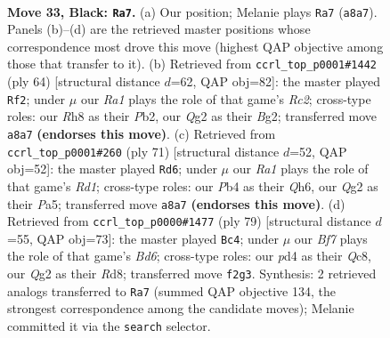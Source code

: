 \documentclass[11pt]{article}
\begin{document}
\clearpage

\begin{figure}[p]\centering
\begin{subfigure}{0.46\textwidth}\centering
\resizebox{\linewidth}{!}{%
\newchessgame
\chessboard[
  setfen={r6r/4k2p/1pp1p1p1/6P1/1p1P4/PP1KP3/R4bq1/2BQ4 b - - 0 33},
  showmover=false,
  pgfstyle=straightmove, color=movearrow, markmove={a8-a7}
]}
\caption{}
\end{subfigure}\hfill
\begin{subfigure}{0.46\textwidth}\centering
\resizebox{\linewidth}{!}{%
\newchessgame
\chessboard[
  setfen={3r2k1/p1q2bp1/1p6/2pp4/P2P3P/3Q2P1/1PR3BK/8 w - - 10 33},
  showmover=false,
  pgfstyle=straightmove, color=movearrow, markmove={c2-f2}
]}
\caption{}
\end{subfigure}
\\[4pt]
\begin{subfigure}{0.46\textwidth}\centering
\resizebox{\linewidth}{!}{%
\newchessgame
\chessboard[
  setfen={r2r4/6pk/7q/p3p3/1p2P3/1PP3P1/1B1PQ3/1K1R4 b - - 1 36},
  showmover=false,
  pgfstyle=straightmove, color=movearrow, markmove={d8-d6}
]}
\caption{}
\end{subfigure}\hfill
\begin{subfigure}{0.46\textwidth}\centering
\resizebox{\linewidth}{!}{%
\newchessgame
\chessboard[
  setfen={2qr2k1/5rpp/5P2/2p1B1P1/p3P3/P2b3P/5RBK/4Q3 b - - 0 40},
  showmover=false,
  pgfstyle=straightmove, color=movearrow, markmove={d3-c4}
]}
\caption{}
\end{subfigure}
\caption{\textbf{Move 33, Black: \texttt{Ra7}.} (a) Our position; Melanie plays \texttt{Ra7} (\texttt{a8a7}). Panels (b)--(d) are the retrieved master positions whose correspondence most drove this move (highest QAP objective among those that transfer to it). (b) Retrieved from \texttt{ccrl\_top\_p0001\#1442} (ply 64) [structural distance $d$=62, QAP obj=82]: the master played \texttt{Rf2}; under $\mu$ our \emph{Ra1} plays the role of that game's \emph{Rc2}; cross-type roles: our \emph{R}h8 as their \emph{P}b2, our \emph{Q}g2 as their \emph{B}g2; transferred move \texttt{a8a7} \textbf{(endorses this move)}. (c) Retrieved from \texttt{ccrl\_top\_p0001\#260} (ply 71) [structural distance $d$=52, QAP obj=52]: the master played \texttt{Rd6}; under $\mu$ our \emph{Ra1} plays the role of that game's \emph{Rd1}; cross-type roles: our \emph{P}b4 as their \emph{Q}h6, our \emph{Q}g2 as their \emph{P}a5; transferred move \texttt{a8a7} \textbf{(endorses this move)}. (d) Retrieved from \texttt{ccrl\_top\_p0000\#1477} (ply 79) [structural distance $d$=55, QAP obj=73]: the master played \texttt{Bc4}; under $\mu$ our \emph{Bf7} plays the role of that game's \emph{Bd6}; cross-type roles: our \emph{p}d4 as their \emph{Q}c8, our \emph{Q}g2 as their \emph{R}d8; transferred move \texttt{f2g3}. Synthesis: 2 retrieved analogs transferred to \texttt{Ra7} (summed QAP objective 134, the strongest correspondence among the candidate moves); Melanie committed it via the \texttt{search} selector.}
\label{fig:thought-m65}
\end{figure}
\end{document}
